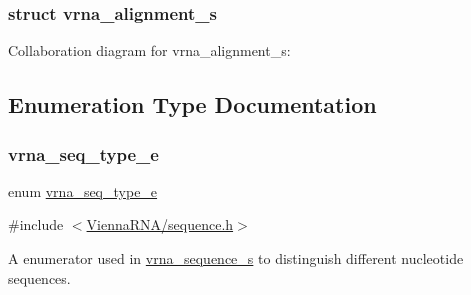 \subsubsection{struct vrna\+\_\+alignment\+\_\+s}


Collaboration diagram for vrna\+\_\+alignment\+\_\+s\+:


\subsection{Enumeration Type Documentation}
\mbox{\label{group__alphabet__utils_ga85cda3fcf5d6bd7ec090d3a96e808609}} 
\subsubsection{\texorpdfstring{vrna\_seq\_type\_e}{vrna\_seq\_type\_e}}
{\footnotesize\ttfamily enum \mbox{\hyperlink{group__alphabet__utils_ga85cda3fcf5d6bd7ec090d3a96e808609}{vrna\+\_\+seq\+\_\+type\+\_\+e}}}



{\ttfamily \#include $<$\mbox{\hyperlink{sequence_8h}{Vienna\+R\+N\+A/sequence.\+h}}$>$}



A enumerator used in \mbox{\hyperlink{group__alphabet__utils_structvrna__sequence__s}{vrna\+\_\+sequence\+\_\+s}} to distinguish different nucleotide sequences. 

